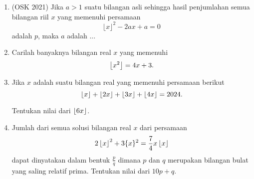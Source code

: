 \documentclass[11pt]{scrartcl}
\begin{document}
\begin{enumerate}
    \item (OSK 2021) Jika $a > 1$ suatu bilangan asli sehingga hasil penjumlahan semua bilangan riil $x$ yang memenuhi persamaan
    $$\lfloor x \rfloor^2 - 2ax + a = 0$$
    adalah $p$, maka $a$ adalah ...

    \item Carilah banyaknya bilangan real $x$ yang memenuhi
    $$\left\lfloor x^2 \right\rfloor=4x+3.$$

    \item Jika $x$ adalah suatu bilangan real yang memenuhi persamaan berikut
    $$\left\lfloor x \right\rfloor+\left\lfloor 2x \right\rfloor+\left\lfloor 3x \right\rfloor+\left\lfloor 4x \right\rfloor=2024.$$

    Tentukan nilai dari $\left\lfloor 6x \right\rfloor$.

    \item Jumlah dari semua solusi bilangan real $x$ dari persamaan
    $$2\left\lfloor x \right\rfloor^2+3\{x\}^2=\frac{7}{4}x\left\lfloor x \right\rfloor$$
    dapat dinyatakan dalam bentuk $\frac{p}{q}$ dimana $p$ dan $q$ merupakan bilangan bulat yang saling relatif prima. Tentukan nilai dari $10p+q$.
\end{enumerate}
\end{document}
